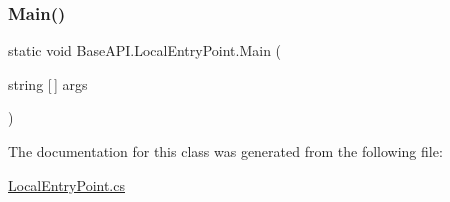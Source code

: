 \subsubsection{\texorpdfstring{Main()}{Main()}}
{\footnotesize\ttfamily static void Base\+A\+P\+I.\+Local\+Entry\+Point.\+Main (\begin{DoxyParamCaption}\item[{string \mbox{[}$\,$\mbox{]}}]{args }\end{DoxyParamCaption})\hspace{0.3cm}{\ttfamily [static]}}



The documentation for this class was generated from the following file\+:\begin{DoxyCompactItemize}
\item 
\mbox{\hyperlink{_local_entry_point_8cs}{Local\+Entry\+Point.\+cs}}\end{DoxyCompactItemize}
